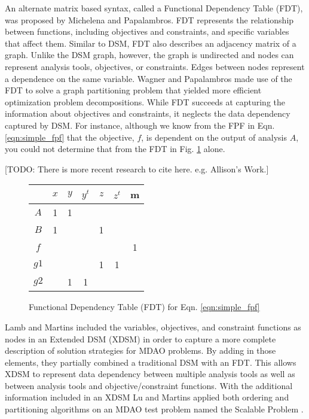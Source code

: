     An alternate matrix based syntax, called a Functional Dependency Table (FDT), was proposed by Michelena and Papalambros. 
    FDT represents the relationship between functions, including objectives and constraints, and specific variables that affect 
    them\cite{Michelena1997}. Similar to DSM, FDT also describes an adjacency matrix of a graph. Unlike the DSM graph, 
    however, the graph is undirected and nodes can represent analysis tools, objectives, 
    or constraints. Edges between nodes represent a dependence on the same 
    variable. Wagner and Papalambros made use of the FDT to solve a graph partitioning problem that yielded 
    more efficient optimization problem decompositions\cite{Wagner1993}. While FDT succeeds at capturing the 
    information about objectives and constraints, it neglects the data dependency captured by DSM. For instance, 
    although we know from the FPF in Eqn. \ref{eqn:simple_fpf} that the objective, $f$, is dependent on the 
    output of analysis $A$, you could not determine that from the FDT in Fig. \ref{fig:FDT_simple} alone. 
    
    [TODO: There is more recent research to cite here. e.g. Allison's Work.]

    \begin{figure}
        \begin{center}
        \begin{tabular}{|c|c|c|c|c|c|c|}
            \hline
                 & $x$ & $y$ & $y^t$ & $z$ & $z^t$ & m \\ \hline
            $A$  & 1  & 1    &       &     &       &   \\ \hline
            $B$  & 1  &      &       & 1   &       &   \\ \hline
            $f$  &    &      &       &     &       & 1 \\ \hline
            $g1$ &    &      &       & 1   & 1     &   \\ \hline
            $g2$ &    & 1    & 1     &     &       &   \\
            \hline
        \end{tabular}
        \caption{Functional Dependency Table (FDT) for Eqn. \ref{eqn:simple_fpf} \label{fig:FDT_simple}}
        \end{center}
    \end{figure}

    Lamb and Martins included the variables, objectives, and constraint functions as nodes in an Extended 
    DSM (XDSM) in order to capture a more complete description of solution strategies for MDAO problems\cite{Lambe2012}. By adding in those 
    elements, they partially combined a traditional DSM with an FDT. 
    This allows XDSM to represent data dependency between multiple analysis tools as well as between analysis tools and
    objective/constraint functions. With the additional information included in an XDSM Lu and Martins applied both ordering and partitioning 
    algorithms on an MDAO test problem named the Scalable Problem \cite{Lu2012}. 

